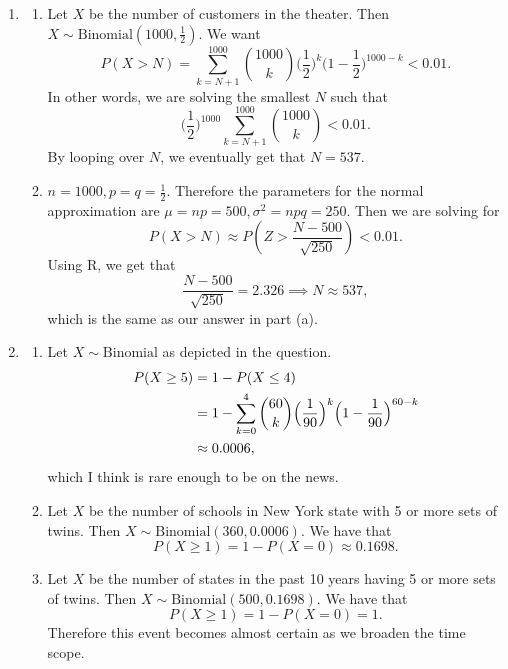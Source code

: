 \documentclass{article}
\begin{document}
\begin{enumerate}
    \item \begin{enumerate}
        \item Let $X$ be the number of customers in the theater. Then 
        $X \sim \text{Binomial}(1000, \frac{1}{2}).$ We want 
        \[ P(X > N) = \sum_{k = N + 1}^{1000} \binom{1000}{k} \Big( \frac{1}{2} \Big)^{k} 
        \Big( 1 - \frac{1}{2} \Big)^{1000 - k} < 0.01.\]
        In other words, we are solving the smallest $N$ such that 
        \[ \Big( \frac{1}{2} \Big)^{1000} \sum_{k = N + 1}^{1000} \binom{1000}{k} < 0.01. \]
        By looping over $N$, we eventually get that $N = 537$.

        \item $n = 1000, p = q = \frac{1}{2}$. Therefore the parameters for the normal 
        approximation are $\mu = np = 500, \sigma^2 = npq = 250$. Then we are solving for 
        \[ P(X > N) \approx P(Z > \frac{N - 500}{\sqrt{250}}) < 0.01. \]
        Using R, we get that 
        \[ \frac{N - 500}{\sqrt{250}} = 2.326 \implies N \approx 537, \]
        which is the same as our answer in part (a).
    \end{enumerate} 

    \item \begin{enumerate}
        \item Let $X \sim \text{Binomial}$ as depicted in the question. 
        \begin{align*}
            P(X \geq 5)
            &= 1 - P(X \leq 4) \\
            &= 1 - \sum_{k = 0}^{4} \binom{60}{k} \Big( \frac{1}{90} \Big)^{k} 
            \Bigl( 1 - \frac{1}{90} \Bigr)^{60 - k} \\
            &\approx 0.0006,
        \end{align*}
        which I think is rare enough to be on the news.

        \item Let $X$ be the number of schools in New York state with 5 or more sets of twins. Then 
        $X \sim \text{Binomial}(360, 0.0006)$. We have that 
        \[ P(X \geq 1) = 1 - P(X = 0) \approx 0.1698. \]

        \item Let $X$ be the number of states in the past 10 years having 5 or more sets of twins. Then 
        $X \sim \text{Binomial}(500, 0.1698)$. We have that 
        \[ P(X \geq 1) = 1 - P(X = 0) = 1. \]
        Therefore this event becomes almost certain as we broaden the time scope.
    \end{enumerate}


\end{enumerate}
\end{document}
